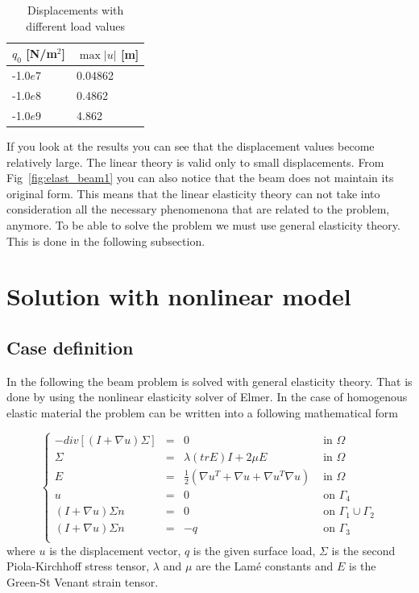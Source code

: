 \begin{table}[h]
\caption{Displacements with different load values}
\label{tb:struct3a}
\begin{center}
\begin{tabular}{ll} \hline
$q_0$ [N/m$^2$] & $\max |u|$ [m] \\ \hline
-1.0$e7$ & 0.04862 \\
-1.0$e8$ & 0.4862 \\
-1.0$e9$ & 4.862 \\ \hline
\end{tabular}
\end{center}
\end{table}

If you look at the results you can see that the displacement values
become relatively large. The linear theory is valid only to small 
displacements. From Fig~\ref{fig:elast_beam1} you can also notice that the
beam does not maintain its original form. This means that the linear 
elasticity theory can not take into consideration all the necessary 
phenomenona that are related to the problem, anymore. To be able to 
solve the problem we must use general elasticity theory. This is done 
in the following subsection.


\section{Solution with nonlinear model}


\subsection*{Case definition}

In the following the beam problem is solved with general elasticity theory.
That is done by using the nonlinear elasticity solver of Elmer. 
In the case of homogenous 
elastic material the problem can be written into a following mathematical form

\begin{equation}
\left \{
\begin{array}{rcll}
-div [(I+ \nabla u) \Sigma] & = & 0 & \mbox{ in } \Omega \nonumber \\
\Sigma & = & \lambda (tr E)I + 2 \mu E & \mbox{ in } \Omega \nonumber \\
E & = & \frac{1}{2}(\nabla u^{T} + \nabla u + \nabla u^{T} \nabla u) & 
\mbox{ in } \Omega \nonumber \\
u & = & 0 & \mbox{ on } \Gamma_4 \\
(I+ \nabla u)\Sigma n & = & 0 & \mbox{ on } \Gamma_1 \cup \Gamma_2 \\
(I+ \nabla u)\Sigma n & = & -q & \mbox{ on } \Gamma_3 \\
\end{array}
\right .
\end{equation}
where $u$ is the displacement vector, $q$ is the given surface load, $\Sigma$ 
is the second Piola-Kirchhoff stress tensor, $\lambda$ and $\mu$ are the 
Lam\'{e} constants and $E$ is the Green-St Venant strain tensor.


